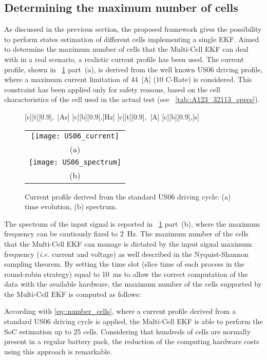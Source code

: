 \documentclass[journal]{IEEEtran}
\begin{document}
\subsection{Determining the maximum number of cells}
\label{sec::maximum_number}  
As discussed in the previous section, the proposed framework gives the possibility to perform states estimation of different cells implementing a single EKF. 
Aimed to determine the maximum number of cells that the Multi-Cell EKF can deal with in a real scenario, a realistic current profile has been used.
The current profile, shown in \figurename~\ref{fig::US06_current} part~(a), is derived from the well known US06 driving profile, where a maximum current limitation of 44~[A] (10 C-Rate) is considered. This constraint has been applied only for safety reasons, based on the cell characteristics of the cell used in the actual test (see \tablename~\ref{tab::A123_32113_specs}).
\begin{figure}[!htbp]
	\centering
	[t][0.9]{\scriptsize{,~[As]}}
	[b][0.9]{\scriptsize{,[Hz]}}
	[t][0.9]{\scriptsize{,~[A]}}
    [c][b][0.9]{\scriptsize{,[s]}}
	\begin{tabular}{c}
	   \texttt{[image: US06\_current]}\\
	   (a)\\
	   \texttt{[image: US06\_spectrum]}\\
	   (b)\\
	\end{tabular}
	\caption{Current profile derived from the standard US06 driving cycle: (a) time evolution, (b) spectrum.}
	\label{fig::US06_current}
\end{figure}
The spectrum of the input signal  is reported in \figurename~\ref{fig::US06_current} part~(b), where the maximum frequency can be cautiously fixed to 2~Hz.
The maximum number of the cells that the Multi-Cell EKF can manage is dictated by the input signal maximum frequency (\textit{i.e.} current and voltage) as well described in the Nyquist-Shannon sampling theorem.
By setting the time slot  (slice time of each process in the round-robin strategy) equal to 10~ms to allow the correct computation of the data with the available hardware, the maximum number of the cells supported by the Multi-Cell EKF is computed as follows:

According with \eqref{eq::number_cells}, where a current profile derived from a standard US06 driving cycle is applied, the Multi-Cell EKF is able to perform the SoC estimation up to 25 cells. 
Considering that hundreds of cells are normally present in a regular battery pack, the reduction of the computing hardware costs using this approach is remarkable.
\end{document}
